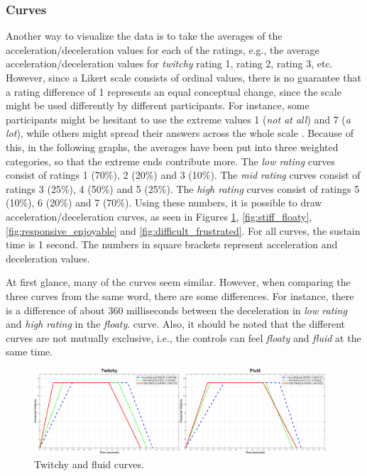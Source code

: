 \subsubsection{Curves}
Another way to visualize the data is to take the averages of the acceleration/deceleration values for each of the ratings, e.g., the average acceleration/deceleration values for \textit{twitchy} rating 1, rating 2, rating 3, etc. However, since a Likert scale consists of ordinal values, there is no guarantee that a rating difference of 1 represents an equal conceptual change, since the scale might be used differently by different participants. For instance, some participants might be hesitant to use the extreme values 1 (\textit{not at all}) and 7 (\textit{a lot}), while others might spread their answers across the whole scale \cite{cunningham}. Because of this, in the following graphs, the averages have been put into three weighted categories, so that the extreme ends contribute more. The \textit{low rating} curves consist of ratings 1 (70\%), 2 (20\%) and 3 (10\%). The \textit{mid rating} curves consist of ratings 3 (25\%), 4 (50\%) and 5 (25\%). The \textit{high rating} curves consist of ratings 5 (10\%), 6 (20\%) and 7 (70\%). Using these numbers, it is possible to draw acceleration/deceleration curves, as seen in Figures \ref{fig:twitchy_fluid}, \ref{fig:stiff_floaty}, \ref{fig:responsive_enjoyable} and \ref{fig:difficult_frustrated}. For all curves, the sustain time is 1 second. The numbers in square brackets represent acceleration and deceleration values.

At first glance, many of the curves seem similar. However, when comparing the three curves from the same word, there are some differences. For instance, there is a difference of about 360 milliseconds between the deceleration in \textit{low rating} and \textit{high rating} in the \textit{floaty}. curve. Also, it should be noted that the different curves are not mutually exclusive, i.e., the controls can feel \textit{floaty} and \textit{fluid} at the same time.
\begin{figure}[!htb]
\centering
\includegraphics[width=0.97\textwidth]{Pics/Curves/twitchy_fluid}
\caption{Twitchy and fluid curves.}
\label{fig:twitchy_fluid}
\end{figure}


